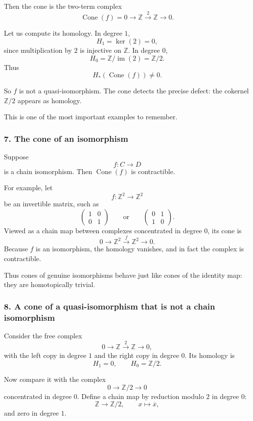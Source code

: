 \documentclass[12pt,a4paper]{article}
\theoremstyle{notespace}
\begin{document}
Then the cone is the two-term complex
\[
\operatorname{Cone}(f)=
0\longrightarrow \mathbb Z \xrightarrow{2} \mathbb Z \longrightarrow 0.
\]

Let us compute its homology. In degree \(1\),
\[
H_1=\ker(2)=0,
\]
since multiplication by \(2\) is injective on \(\mathbb Z\). In degree \(0\),
\[
H_0=\mathbb Z/\operatorname{im}(2)=\mathbb Z/2.
\]
Thus
\[
H_*(\operatorname{Cone}(f))\neq 0.
\]

So \(f\) is not a quasi-isomorphism. The cone detects the precise defect: the cokernel \(\mathbb Z/2\) appears as homology.

This is one of the most important examples to remember.

\subsubsection*{7. The cone of an isomorphism}

Suppose
\[
f:C\to D
\]
is a chain isomorphism. Then \(\operatorname{Cone}(f)\) is contractible.

For example, let
\[
f:\mathbb Z^2\to \mathbb Z^2
\]
be an invertible matrix, such as
\[
\begin{pmatrix}
	1&0\\
	0&1
\end{pmatrix}
\qquad\text{or}\qquad
\begin{pmatrix}
	0&1\\
	1&0
\end{pmatrix}.
\]
Viewed as a chain map between complexes concentrated in degree \(0\), its cone is
\[
0\longrightarrow \mathbb Z^2 \xrightarrow{f} \mathbb Z^2 \longrightarrow 0.
\]
Because \(f\) is an isomorphism, the homology vanishes, and in fact the complex is contractible.

Thus cones of genuine isomorphisms behave just like cones of the identity map: they are homotopically trivial.

\subsubsection*{8. A cone of a quasi-isomorphism that is not a chain isomorphism}

Consider the free complex
\[
0 \longrightarrow \mathbb Z \xrightarrow{2} \mathbb Z \longrightarrow 0,
\]
with the left copy in degree \(1\) and the right copy in degree \(0\). Its homology is
\[
H_1=0,
\qquad
H_0=\mathbb Z/2.
\]

Now compare it with the complex
\[
0\longrightarrow \mathbb Z/2 \longrightarrow 0
\]
concentrated in degree \(0\). Define a chain map by reduction modulo \(2\) in degree \(0\):
\[
\mathbb Z\to \mathbb Z/2,\qquad x\mapsto \overline{x},
\]
and zero in degree \(1\).
\end{document}
